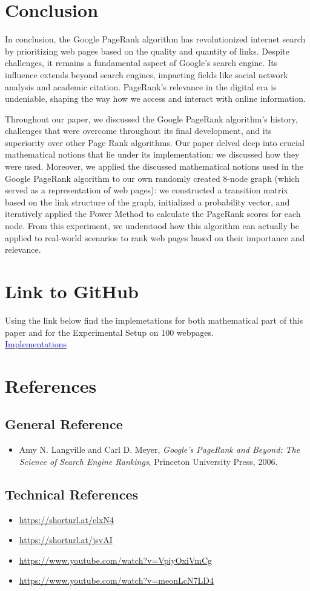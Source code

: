 \documentclass{article}
\begin{document}
\section{Conclusion}

In conclusion, the Google PageRank algorithm has revolutionized internet search by prioritizing web pages based on the quality and quantity of links. Despite challenges, it remains a fundamental aspect of Google's search engine. Its influence extends beyond search engines, impacting fields like social network analysis and academic citation. PageRank's relevance in the digital era is undeniable, shaping the way how we access and interact with online information.

Throughout our paper, we discussed the Google PageRank algorithm’s history, challenges that were overcome throughout its final development, and its superiority over other Page Rank algorithms. Our paper delved deep into crucial mathematical notions that lie under its implementation: we discussed how they were used. Moreover, we applied the discussed mathematical notions used in the Google PageRank algorithm to our own randomly created 8-node graph (which served as a representation of web pages): we constructed a transition matrix based on the link structure of the graph, initialized a probability vector, and iteratively applied the Power Method to calculate the PageRank scores for each node. From this experiment, we understood how this algorithm can actually be applied to real-world scenarios to rank web pages based on their importance and relevance.
\\

\section{Link to GitHub}

Using the link below find the implemetations for both mathematical part of this paper and for the Experimental Setup on 100 webpages.
\\

\href{https://github.com/armenghazaryann/PageRanking}{\textcolor{blue}{Implementations}}

\section{References}

\subsection{General Reference}
\begin{itemize}
    \item Amy N. Langville and Carl D. Meyer, \textit{Google’s PageRank and Beyond: The Science of Search Engine Rankings}, Princeton University Press, 2006.
\end{itemize}

\subsection{Technical References}
\begin{itemize}
    \item \url{https://shorturl.at/elxN4}
    \item \url{https://shorturl.at/jsyAI}
    \item \url{https://www.youtube.com/watch?v=VpiyOxiVmCg}
    \item \url{https://www.youtube.com/watch?v=meonLcN7LD4}
\end{itemize}
\end{document}
